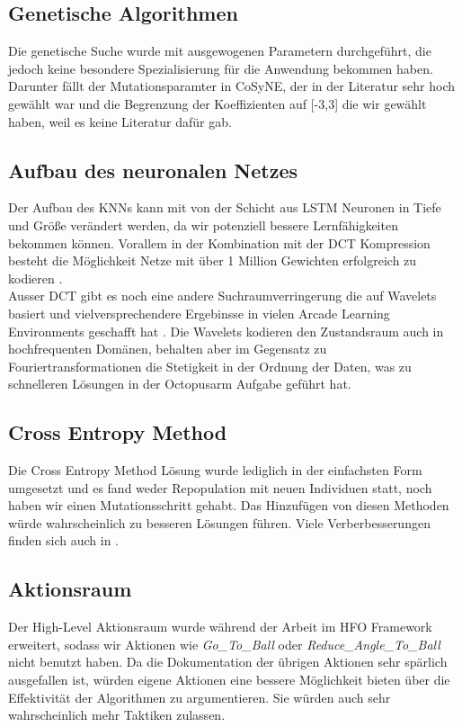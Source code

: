         \subsection*{Genetische Algorithmen}
            Die genetische Suche wurde mit ausgewogenen Parametern durchgeführt, die jedoch keine besondere Spezialisierung für die Anwendung bekommen haben. Darunter fällt der Mutationsparamter in CoSyNE, der in der Literatur sehr hoch gewählt war \cite{cosyne2} und die Begrenzung der Koeffizienten auf [-3,3] die wir gewählt haben, weil es keine Literatur dafür gab. 
        \subsection*{Aufbau des neuronalen Netzes}
            Der Aufbau des KNNs kann mit von der Schicht aus LSTM Neuronen in Tiefe und Größe verändert werden, da wir potenziell bessere Lernfähigkeiten bekommen können. Vorallem in der Kombination mit der DCT Kompression besteht die Möglichkeit Netze mit über 1 Million Gewichten erfolgreich zu kodieren \cite{cosyne4}. \\[2mm]
            \noindent
            Ausser DCT gibt es noch eine andere Suchraumverringerung die auf Wavelets basiert und vielversprechendere Ergebinsse in vielen Arcade Learning Environments geschafft hat \cite{wavelet}. Die Wavelets kodieren den Zustandsraum auch in hochfrequenten Domänen, behalten aber im Gegensatz zu Fouriertransformationen die Stetigkeit in der Ordnung der Daten, was zu schnelleren Lösungen in der Octopusarm Aufgabe geführt hat.

        \subsection*{Cross Entropy Method}
            Die Cross Entropy Method Lösung wurde lediglich in der einfachsten Form umgesetzt und es fand weder Repopulation mit neuen Individuen statt, noch haben wir einen Mutationsschritt gehabt. Das Hinzufügen von diesen Methoden würde wahrscheinlich zu besseren Lösungen führen. Viele Verberbesserungen finden sich auch in \cite{cem}.

        \subsection*{Aktionsraum}
            Der High-Level Aktionsraum wurde während der Arbeit im HFO Framework erweitert, sodass wir Aktionen wie \textit{Go\_To\_Ball} oder \textit{Reduce\_Angle\_To\_Ball} nicht benutzt haben. Da die Dokumentation der übrigen Aktionen sehr spärlich ausgefallen ist, würden eigene Aktionen eine bessere Möglichkeit bieten über die Effektivität der Algorithmen zu argumentieren. Sie würden auch sehr wahrscheinlich mehr Taktiken zulassen.

